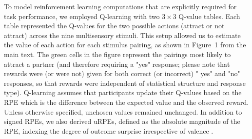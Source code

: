 \documentclass{article}
\begin{document}
To model reinforcement learning computations that are explicitly required for task performance, we employed Q-learning with two $3\times 3$ Q-value tables. Each table represented the Q-values for the two possible actions (attract or not attract) across the nine multisensory stimuli. This setup allowed us to estimate the value of each action for each stimulus pairing, as shown in Figure~1 from the main text. The green cells in the figure represent the pairings most likely to attract a partner (and therefore requiring a "yes" response; please note that rewards were (or were not) given for both correct (or incorrect) " yes" and "no" responses, so that rewards were independent of statistical structure and response type). Q-learning assumes that participants update their Q-values based on the RPE which is the difference between the expected value and the observed reward. Unless otherwise specified, unchosen values remained unchanged. In addition to signed RPEs, we also derived uRPEs, defined as the absolute magnitude of the RPE, indexing the degree of outcome surprise irrespective of valence \cite{fouragnan2018separate, corlett2022meta}.
\end{document}
